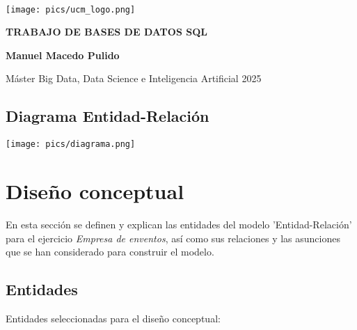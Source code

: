 \documentclass[12pt]{article}
\begin{document}
\begin{titlepage}

        \centering
        {\bfseries \ }
        \vspace{2cm}
        
        {\texttt{[image: pics/ucm\_logo.png]}} 
        \vspace{0.6cm}
        
        {\bfseries \Large TRABAJO DE BASES DE DATOS SQL}
        \vspace{1.75cm}
        
        {\bfseries \LARGE Manuel Macedo Pulido}
        \vspace{6mm} 

        {\large Máster Big Data, Data Science e Inteligencia Artificial}
        {\large 2025 }
        \vspace{6mm}

        \thispagestyle{empty}

    \end{titlepage}

    \setcounter{page}{1}

    \newpage
    \tableofcontents

    \newpage
    \begin{landscape}

        \section{Diagrama Entidad-Relación}
        {\texttt{[image: pics/diagrama.png]}} 

    \end{landscape}

    \newpage
    \section{Diseño conceptual}
    En esta sección se definen y explican las entidades del modelo 'Entidad-Relación' para el ejercicio \textit{Empresa de enventos}, 
    así como sus relaciones y las asunciones que se han considerado para construir el modelo. 

    \subsection{Entidades}
    Entidades seleccionadas para el diseño conceptual:
\end{document}
